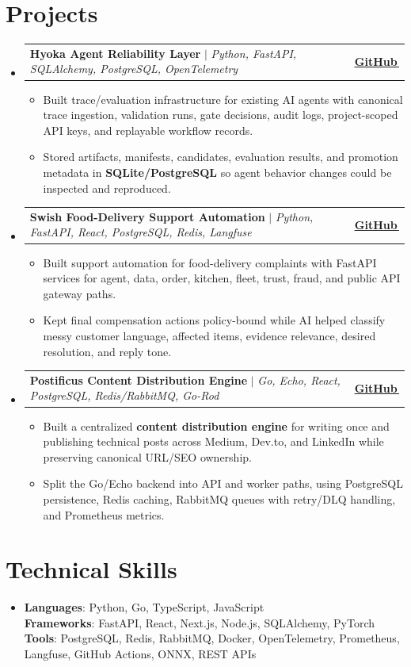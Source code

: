 \documentclass[letterpaper,11pt]{article}
\makeatletter
\newcommand{\bodyhref}[2]{\href{#1}{\underline{#2}\,\faExternalLink*}}
\newcommand{\resumeItem}[1]{\item{\fontsize{8.82pt}{9.28pt}\selectfont #1\vspace{-0.7pt}}}
\newcommand{\resumeProjectHeading}[2]{
    \item
    \begin{tabular*}{1.0\textwidth}{l@{\extracolsep{\fill}}r}
      \small#1 & \textbf{\small #2}\\
    \end{tabular*}\vspace{-4pt}
}
\newcommand{\resumeSubHeadingListStart}{\begin{itemize}[leftmargin=0.0in, label={}, itemsep=0.6pt, topsep=0pt, parsep=0pt, partopsep=0pt]}
\newcommand{\resumeSubHeadingListEnd}{\end{itemize}}
\newcommand{\resumeItemListStart}{\begin{itemize}[leftmargin=0.16in,itemsep=0.3pt,topsep=0.9pt,parsep=0pt,partopsep=0pt]}
\newcommand{\resumeItemListEnd}{\end{itemize}\vspace{-3pt}}
\makeatother
\begin{document}
\section{Projects}
\resumeSubHeadingListStart
\resumeProjectHeading
{\textbf{Hyoka Agent Reliability Layer} $|$ \emph{Python, FastAPI, SQLAlchemy, PostgreSQL, OpenTelemetry}}{\bodyhref{https://github.com/unichronic/hyoka}{GitHub}}
\resumeItemListStart
\resumeItem{Built trace/evaluation infrastructure for existing AI agents with canonical trace ingestion, validation runs, gate decisions, audit logs, project-scoped API keys, and replayable workflow records.}
\resumeItem{Stored artifacts, manifests, candidates, evaluation results, and promotion metadata in \textbf{SQLite/PostgreSQL} so agent behavior changes could be inspected and reproduced.}
\resumeItemListEnd
\resumeProjectHeading
{\textbf{Swish Food-Delivery Support Automation} $|$ \emph{Python, FastAPI, React, PostgreSQL, Redis, Langfuse}}{\bodyhref{https://github.com/unichronic/swishagent}{GitHub}}
\resumeItemListStart
\resumeItem{Built support automation for food-delivery complaints with FastAPI services for agent, data, order, kitchen, fleet, trust, fraud, and public API gateway paths.}
\resumeItem{Kept final compensation actions policy-bound while AI helped classify messy customer language, affected items, evidence relevance, desired resolution, and reply tone.}
\resumeItemListEnd
\resumeProjectHeading
{\textbf{Postificus Content Distribution Engine} $|$ \emph{Go, Echo, React, PostgreSQL, Redis/RabbitMQ, Go-Rod}}{\bodyhref{https://github.com/unichronic/postificus}{GitHub}}
\resumeItemListStart
\resumeItem{Built a centralized \textbf{content distribution engine} for writing once and publishing technical posts across Medium, Dev.to, and LinkedIn while preserving canonical URL/SEO ownership.}
\resumeItem{Split the Go/Echo backend into API and worker paths, using PostgreSQL persistence, Redis caching, RabbitMQ queues with retry/DLQ handling, and Prometheus metrics.}
\resumeItemListEnd
\resumeSubHeadingListEnd

\section{Technical Skills}
\begin{itemize}[leftmargin=0.15in, label={}, topsep=0pt, itemsep=0pt, parsep=0pt, partopsep=0pt]
  \item{\fontsize{9.0pt}{9.25pt}\selectfont
   \textbf{Languages}{: Python, Go, TypeScript, JavaScript} \\
   \textbf{Frameworks}{: FastAPI, React, Next.js, Node.js, SQLAlchemy, PyTorch} \\
   \textbf{Tools}{: PostgreSQL, Redis, RabbitMQ, Docker, OpenTelemetry, Prometheus, Langfuse, GitHub Actions, ONNX, REST APIs} \\
  }
\end{itemize}
\end{document}
